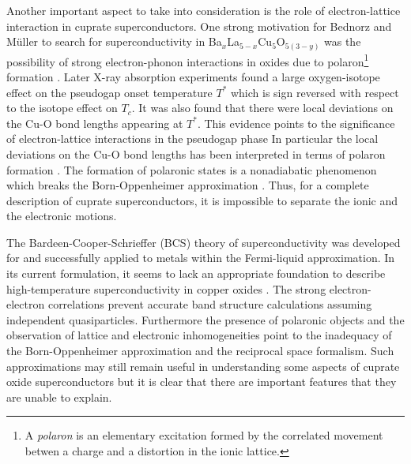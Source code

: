 Another important aspect to take into consideration is the role of electron-lattice interaction in cuprate superconductors.
One strong motivation for Bednorz and M\"{u}ller to search for superconductivity in Ba$_x$La$_{5-x}$Cu$_5$O$_{5(3-y)}$ was the possibility of strong electron-phonon interactions in oxides due to polaron\footnote{A \textit{polaron} is an elementary excitation formed by the correlated movement betwen a charge and a distortion in the ionic lattice.} formation \cite{Bednorz1986}.
Later X-ray absorption experiments found a large oxygen-isotope effect on the pseudogap onset temperature $T^*$ which is sign reversed with respect to the isotope effect on $T_c$.
It was also found that there were local deviations on the Cu-O bond lengths appearing at $T^*$.
This evidence points to the significance of electron-lattice interactions in the pseudogap phase
In particular the local deviations on the Cu-O bond lengths has been interpreted in terms of polaron formation \cite{MustredeLeon1992}.
The formation of polaronic states is a nonadiabatic phenomenon which breaks the Born-Oppenheimer approximation \cite{Born1927}.
Thus, for a complete description of cuprate superconductors, it is impossible to separate the ionic and the electronic motions.

The Bardeen-Cooper-Schrieffer (BCS) theory of superconductivity \cite{Bardeen1957} was developed for and successfully applied to metals within the Fermi-liquid approximation. In its current formulation, it seems to lack an appropriate foundation to describe high-temperature superconductivity in copper oxides \cite{Damascelli2003}.
The strong electron-electron correlations prevent accurate band structure calculations assuming independent quasiparticles.
Furthermore the presence of polaronic objects and the observation of lattice and electronic inhomogeneities point to the inadequacy of the Born-Oppenheimer approximation and the reciprocal space formalism.
Such approximations may still remain useful in understanding some aspects of cuprate oxide superconductors but it is clear that there are important features that they are unable to explain.

